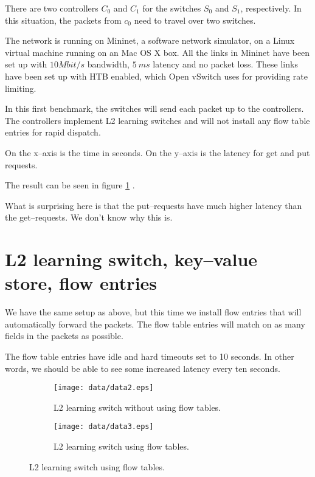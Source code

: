 There are two controllers $C_0$ and $C_1$ for the switches $S_0$ and $S_1$,
respectively.  In this situation, the packets from $c_0$ need to travel
over two switches.

The network is running on Mininet, a software network simulator, on a Linux
virtual machine running on an Mac OS X box.  All the links in Mininet have
been set up with $10 Mbit/s$ bandwidth, $5~ms$ latency and no packet
loss.  These links have been set up with \ac{HTB}
\cite{devera2002hierarchical} enabled, which Open vSwitch
 uses for providing rate limiting.

In this first benchmark, the switches will send each packet up to the
controllers.  The controllers implement L2 learning switches and will not
install any flow table entries for rapid dispatch.

On the x--axis is the time in seconds.  On the y--axis is the latency for
get and put requests.

The result can be seen in figure \ref{benchmark:l2.learning.switch.no.flows} 
.

What is surprising here is that the put--requests have much higher latency
than the get--requests. We don't know why this is.

\section{L2 learning switch, key--value store, flow entries}

We have the same setup as above, but this time we install flow entries that
will automatically forward the packets.  The flow table entries will match
on as many fields in the packets as possible.

The flow table entries have idle and hard timeouts set to 10 seconds.
In other words, we should be able to see some increased latency every ten
seconds.

\begin{figure}
  \centering
  \begin{subfigure}{\textwidth}
    \centering
    \texttt{[image: data/data2.eps]}
    \caption{L2 learning switch without using flow tables.}
    \label{benchmark:l2.learning.switch.no.flows}
  \end{subfigure}

  \centering
  \begin{subfigure}{\textwidth}
    \centering
    \texttt{[image: data/data3.eps]}
    \caption{L2 learning switch using flow tables.}
    \label{benchmark:l2.learning.switch.with.flows}
  \end{subfigure}
\end{figure}


